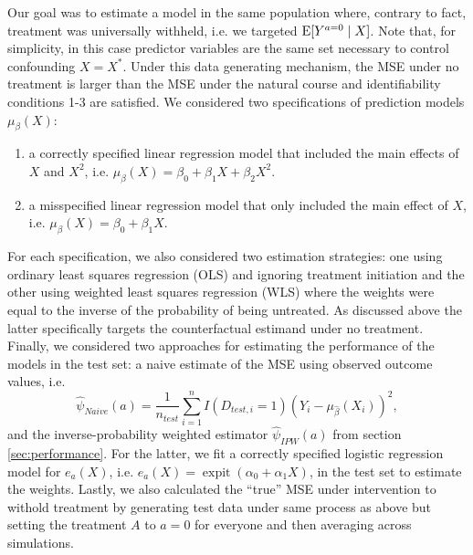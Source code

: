 Our goal was to estimate a model in the same population where, contrary to fact, treatment was universally withheld, i.e. we targeted $\operatorname{E}[Y^{a=0} \mid X]$. Note that, for simplicity, in this case predictor variables are the same set necessary to control confounding $X = X^*$. Under this data generating mechanism, the MSE under no treatment is larger than the MSE under the natural course and identifiability conditions 1-3 are satisfied. We considered two specifications of prediction models $\mu_{\beta}(X)$:
\begin{enumerate}
    \item a correctly specified linear regression model that included the main effects of $X$ and $X^2$, i.e. $\mu_{\beta}(X) = \beta_0 + \beta_1 X + \beta_2 X^2$.
    \item a misspecified linear regression model that only included the main effect of $X$, i.e. $\mu_{\beta}(X) = \beta_0 + \beta_1 X$.
\end{enumerate} 
For each specification, we also considered two estimation strategies: one using ordinary least squares regression (OLS) and ignoring treatment initiation and the other using weighted least squares regression (WLS) where the weights were equal to the inverse of the probability of being untreated. As discussed above the latter specifically targets the counterfactual estimand under no treatment. Finally, we considered two approaches for estimating the performance of the models in the test set: a naive estimate of the MSE using observed outcome values, i.e. 
$$\widehat{\psi}_{Naive}(a) = \frac{1}{n_{test}} \sum_{i=1}^n I(D_{test,i} = 1) (Y_i - \mu_{\widehat{\beta}}(X_i))^2,$$ 
and the inverse-probability weighted estimator $\widehat{\psi}_{IPW}(a)$ from section \ref{sec:performance}. For the latter, we fit a correctly specified logistic regression model for $e_a(X)$, i.e. $e_a(X) = \operatorname{expit}(\alpha_0 + \alpha_1 X)$, in the test set to estimate the weights. Lastly, we also calculated the ``true'' MSE under intervention to withold treatment by generating test data under same process as above but setting the treatment $A$ to $a = 0$ for everyone and then averaging across simulations.

